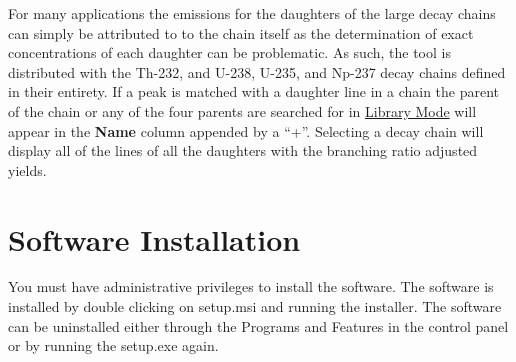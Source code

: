 \documentclass[12pt,report,justified]{SANDreport}
\begin{document}
For many applications the emissions for the daughters of the large decay chains can simply be
attributed to to the chain itself as the determination of exact concentrations of each daughter can
be problematic. As such, the tool is distributed with the Th-232, and U-238, U-235, and Np-237
decay chains defined in their entirety. If a peak is matched with a daughter line in a chain the parent
of the chain or any of the four parents are searched for in \hyperref[sec:lib_mode]{Library Mode} will
appear in the \textbf{Name} column appended by a “+”. Selecting a decay chain will display all of the
lines of all the daughters with the branching ratio adjusted yields.

   \chapter{Software Installation}\label{sec:install}
You must have administrative privileges to install the software. The software is installed by double
clicking on setup.msi and running the installer. The software can be uninstalled either through the
Programs and Features in the control panel or by running the setup.exe again.
        {}


    
\end{document}
